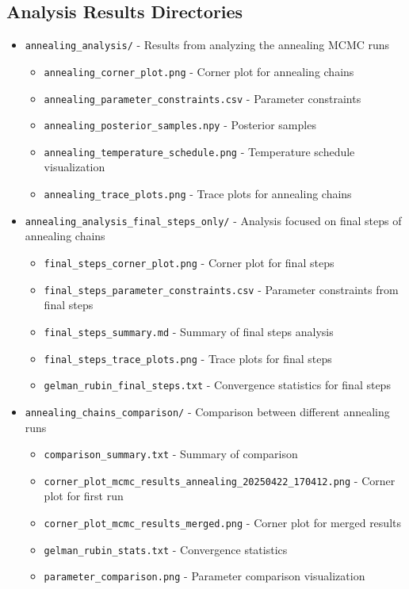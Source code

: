\documentclass[11pt]{article}
\begin{document}
\subsection{Analysis Results Directories}

\begin{itemize}
    \item \texttt{annealing\_analysis/} - Results from analyzing the annealing MCMC runs
    \begin{itemize}
        \item \texttt{annealing\_corner\_plot.png} - Corner plot for annealing chains
        \item \texttt{annealing\_parameter\_constraints.csv} - Parameter constraints
        \item \texttt{annealing\_posterior\_samples.npy} - Posterior samples
        \item \texttt{annealing\_temperature\_schedule.png} - Temperature schedule visualization
        \item \texttt{annealing\_trace\_plots.png} - Trace plots for annealing chains
    \end{itemize}
    
    \item \texttt{annealing\_analysis\_final\_steps\_only/} - Analysis focused on final steps of annealing chains
    \begin{itemize}
        \item \texttt{final\_steps\_corner\_plot.png} - Corner plot for final steps
        \item \texttt{final\_steps\_parameter\_constraints.csv} - Parameter constraints from final steps
        \item \texttt{final\_steps\_summary.md} - Summary of final steps analysis
        \item \texttt{final\_steps\_trace\_plots.png} - Trace plots for final steps
        \item \texttt{gelman\_rubin\_final\_steps.txt} - Convergence statistics for final steps
    \end{itemize}
    
    \item \texttt{annealing\_chains\_comparison/} - Comparison between different annealing runs
    \begin{itemize}
        \item \texttt{comparison\_summary.txt} - Summary of comparison
        \item \texttt{corner\_plot\_mcmc\_results\_annealing\_20250422\_170412.png} - Corner plot for first run
        \item \texttt{corner\_plot\_mcmc\_results\_merged.png} - Corner plot for merged results
        \item \texttt{gelman\_rubin\_stats.txt} - Convergence statistics
        \item \texttt{parameter\_comparison.png} - Parameter comparison visualization
    \end{itemize}
    

\end{itemize}
\end{document}
